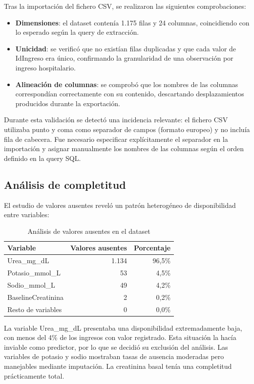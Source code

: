 \documentclass[12pt, a4paper, oneside]{report}
\begin{document}
Tras la importación del fichero CSV, se realizaron las siguientes comprobaciones:

\begin{itemize}
    \item \textbf{Dimensiones}: el dataset contenía 1.175 filas y 24 columnas, coincidiendo con lo esperado según la query de extracción.
    \item \textbf{Unicidad}: se verificó que no existían filas duplicadas y que cada valor de IdIngreso era único, confirmando la granularidad de una observación por ingreso hospitalario.
    \item \textbf{Alineación de columnas}: se comprobó que los nombres de las columnas correspondían correctamente con su contenido, descartando desplazamientos producidos durante la exportación.
\end{itemize}

Durante esta validación se detectó una incidencia relevante: el fichero CSV utilizaba punto y coma como separador de campos (formato europeo) y no incluía fila de cabecera. Fue necesario especificar explícitamente el separador en la importación y asignar manualmente los nombres de las columnas según el orden definido en la query SQL.

\subsection{Análisis de completitud}

El estudio de valores ausentes reveló un patrón heterogéneo de disponibilidad entre variables:

\begin{table}[h]
\centering
\begin{tabular}{lrr}
\hline
\textbf{Variable} & \textbf{Valores ausentes} & \textbf{Porcentaje} \\
\hline
Urea\_mg\_dL & 1.134 & 96,5\% \\
Potasio\_mmol\_L & 53 & 4,5\% \\
Sodio\_mmol\_L & 49 & 4,2\% \\
BaselineCreatinina & 2 & 0,2\% \\
Resto de variables & 0 & 0,0\% \\
\hline
\end{tabular}
\caption{Análisis de valores ausentes en el dataset}
\label{tab:missing}
\end{table}

La variable Urea\_mg\_dL presentaba una disponibilidad extremadamente baja, con menos del 4\% de los ingresos con valor registrado. Esta situación la hacía inviable como predictor, por lo que se decidió su exclusión del análisis. Las variables de potasio y sodio mostraban tasas de ausencia moderadas pero manejables mediante imputación. La creatinina basal tenía una completitud prácticamente total.
\end{document}
